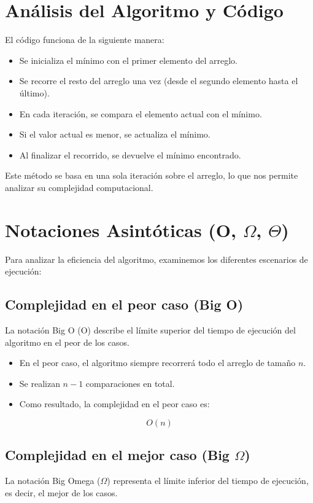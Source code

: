 \documentclass{article}
\begin{document}
	\newpage
	
	
	\section{Análisis del Algoritmo y Código}

	
	El código funciona de la siguiente manera:
	
	\begin{itemize}
		\item Se inicializa el mínimo con el primer elemento del arreglo.
		\item Se recorre el resto del arreglo una vez (desde el segundo elemento hasta el último).
		\item En cada iteración, se compara el elemento actual con el mínimo.
		\item Si el valor actual es menor, se actualiza el mínimo.
		\item Al finalizar el recorrido, se devuelve el mínimo encontrado.
	\end{itemize}
	
	Este método se basa en una sola iteración sobre el arreglo, lo que nos permite analizar su complejidad computacional.
	
	\section{Notaciones Asintóticas (O, $\Omega$, $\Theta$)}
	
	Para analizar la eficiencia del algoritmo, examinemos los diferentes escenarios de ejecución:
	
	\subsection*{Complejidad en el peor caso (Big O)}
	La notación Big O (O) describe el límite superior del tiempo de ejecución del algoritmo en el peor de los casos.
	
	\begin{itemize}
		\item En el peor caso, el algoritmo siempre recorrerá todo el arreglo de tamaño $ n $.
		\item Se realizan $ n-1 $ comparaciones en total.
		\item Como resultado, la complejidad en el peor caso es:
	\end{itemize}
	
	\[
	O(n)
	\]
	
	\subsection*{Complejidad en el mejor caso (Big $\Omega$)}
	La notación Big Omega ($\Omega$) representa el límite inferior del tiempo de ejecución, es decir, el mejor de los casos.
	
\end{document}
